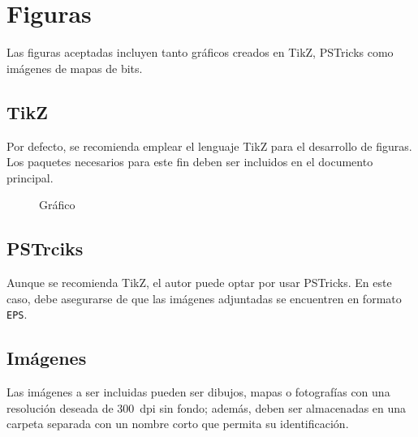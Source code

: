 \documentclass{aleph-revista}
\begin{document}

\section{Figuras}

Las figuras aceptadas incluyen tanto gráficos creados en TikZ, PSTricks como imágenes de mapas de bits.

\subsection{TikZ}

Por defecto, se recomienda emplear el lenguaje TikZ para el desarrollo de figuras. Los paquetes necesarios para este fin deben ser incluidos en el documento principal.

\begin{figure}[H]
    \centering
    \caption{Gráfico}
    \label{fig:grafico2}
\end{figure}

\subsection{PSTrciks}

Aunque se recomienda TikZ, el autor puede optar por usar PSTricks. En este caso, debe asegurarse de que las imágenes adjuntadas se encuentren en formato \texttt{EPS}.

\subsection{Imágenes}

Las imágenes a ser incluidas pueden ser dibujos, mapas o fotografías con una resolución deseada de 300~dpi sin fondo; además, deben ser almacenadas en una carpeta separada con un nombre corto que permita su identificación.
\end{document}
